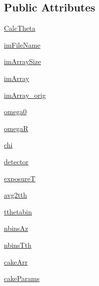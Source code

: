 \subsection*{Public Attributes}
\begin{DoxyCompactItemize}
\item 
\hyperlink{classmy_image_1_1my_image_a4b84b1393353cf07c3f6a8e876b1bd1e}{Calc\-Theta}
\item 
\hyperlink{classmy_image_1_1my_image_ae621f0bcbbeb1a1c5df305d2ff74854b}{im\-File\-Name}
\item 
\hyperlink{classmy_image_1_1my_image_ae295dbccaa65f3c6d829c9f551fd1784}{im\-Array\-Size}
\item 
\hyperlink{classmy_image_1_1my_image_a3b6b9e69cb643420041fd42acfddfbb3}{im\-Array}
\item 
\hyperlink{classmy_image_1_1my_image_a906a618554e161fbe95e24b508ab6e1a}{im\-Array\-\_\-orig}
\item 
\hyperlink{classmy_image_1_1my_image_a7a46de614f68043e9420babac8f2251f}{omega0}
\item 
\hyperlink{classmy_image_1_1my_image_a48c38f81bb2ec3d332ff80510eef2846}{omega\-R}
\item 
\hyperlink{classmy_image_1_1my_image_a854752a842ba427ab11635637efd0ea5}{chi}
\item 
\hyperlink{classmy_image_1_1my_image_acb013415d500b36477f96e19ed9cc3ab}{detector}
\item 
\hyperlink{classmy_image_1_1my_image_a88013815f7b3f0a5dcd02bca7ff96b41}{exposure\-T}
\item 
\hyperlink{classmy_image_1_1my_image_a0635beb1641a5a1b7c1045dbd01bf4c4}{avg2tth}
\item 
\hyperlink{classmy_image_1_1my_image_a979ecbe45f1292ab528cefd83baad4c4}{tthetabin}
\item 
\hyperlink{classmy_image_1_1my_image_aeaf615c8bded2e97661cfc47db6d0371}{nbins\-Az}
\item 
\hyperlink{classmy_image_1_1my_image_a722eda5ce89e24cebc89da923364fb0b}{nbins\-Tth}
\item 
\hyperlink{classmy_image_1_1my_image_a5320605221fb992b852046a41947a458}{cake\-Arr}
\item 
\hyperlink{classmy_image_1_1my_image_a24f984efb2d87cb956bcce7c8a626a41}{cake\-Params}
\end{DoxyCompactItemize}
